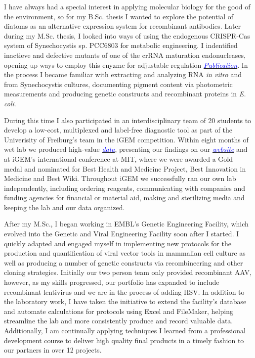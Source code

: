 \documentclass[11pt,a4paper,sans]{moderncv}
\begin{document}
\begin{spacing}{1.15}
I have always had a special interest in applying molecular biology for the good of the environment, so for my B.Sc. thesis I wanted to explore the potential of diatoms as an alternative expression system for recombinant antibodies. 
Later during my M.Sc. thesis, I looked into ways of using the endogenous CRISPR-Cas system of Synechocystis sp. PCC6803 for metabolic engineering. I indentified inactieve and defective mutants of one of the crRNA maturation endonucleases, opening up ways to employ this enyzme for adjustable regulation
{\href{https://www.tandfonline.com/eprint/vmAQ3vjYGdZIZpIKQTIT/full}{\textcolor{blue}{{\textit{Publication}}}}}.
In the process I became familiar with extracting and analyzing RNA \textit{in vitro} and from Synechocystis cultures, documenting pigment content via photometric measurements and producing genetic constructs and recombinant proteins in \textit{E. coli}.
\par%
 
During this time I also participated in an interdisciplinary team of 20 students to develop a low-cost, multiplexed and label-free diagnostic tool as part of the Univerisity of Freiburg's team in the iGEM competition.
Within eight months of wet lab we produced high-value {\href{https://www.ncbi.nlm.nih.gov/pubmed/29803867}{\textcolor{blue}{\textit{data}}}}, presenting our findings on our {\href{http://2015.igem.org/Team:Freiburg/Home_Intro}{\textcolor{blue}{\textit{website}}}} and at iGEM's international conference at MIT, where we were awarded a Gold medal and nominated for Best Health and Medicine Project, Best Innovation in Medicine and Best Wiki.
Throughout iGEM we successfully ran our own lab independently, including ordering reagents, communicating with companies and funding agencies for financial or material aid, making and sterilizing media and keeping the lab and our data organized.\par%
		
After my M.Sc., I began working in EMBL's Genetic Engineering Facility, which evolved into the Genetic and Viral Engineering Facility soon after I started. 
I quickly adapted and engaged myself in implementing new protocols for the production and quantification of viral vector tools in mammalian cell culture as well as producing a number of genetic constructs via recombineering and other cloning strategies.
Initially our two person team only provided recombinant AAV, however, as my skills progressed, our portfolio has expanded to include recombinant lentivirus and we are in the process of adding HSV.
 In addition to the laboratory work, I have taken the initiative to extend the facility's database and automate calculations for protocols using Excel and FileMaker, helping streamline the lab and more consistently produce and record valuable data.
Additionally, I am continually applying techniques I learned from a professional development course to deliver high quality final products in a timely fashion to our partners in over 12 projects.\par%


\end{spacing}
\end{document}
